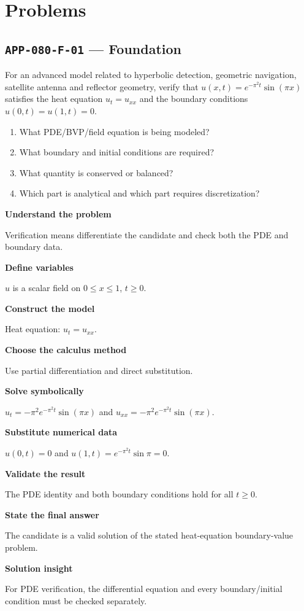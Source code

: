 \documentclass[11pt]{book}
\newcommand{\pid}[1]{\texttt{#1}}
\begin{document}
\section*{Problems}
\subsection*{\pid{APP-080-F-01} — Foundation}
\begin{problembox}
For an advanced model related to hyperbolic detection, geometric navigation, satellite antenna and reflector geometry, verify that $u(x,t)=e^{-\pi^2t}\sin(\pi x)$ satisfies the heat equation $u_t=u_{xx}$ and the boundary conditions $u(0,t)=u(1,t)=0$.
\end{problembox}
\begin{promptbox}\begin{enumerate}
\item What PDE/BVP/field equation is being modeled?
\item What boundary and initial conditions are required?
\item What quantity is conserved or balanced?
\item Which part is analytical and which part requires discretization?
\end{enumerate}\end{promptbox}
\begin{solutionbox}
\textbf{Understand the problem}\par Verification means differentiate the candidate and check both the PDE and boundary data.\par\medskip
\textbf{Define variables}\par $u$ is a scalar field on $0\le x\le1$, $t\ge0$.\par\medskip
\textbf{Construct the model}\par Heat equation: $u_t=u_{xx}$.\par\medskip
\textbf{Choose the calculus method}\par Use partial differentiation and direct substitution.\par\medskip
\textbf{Solve symbolically}\par $u_t=-\pi^2 e^{-\pi^2t}\sin(\pi x)$ and $u_{xx}=-\pi^2 e^{-\pi^2t}\sin(\pi x)$.\par\medskip
\textbf{Substitute numerical data}\par $u(0,t)=0$ and $u(1,t)=e^{-\pi^2t}\sin\pi=0$.\par\medskip
\textbf{Validate the result}\par The PDE identity and both boundary conditions hold for all $t\ge0$.\par\medskip
\textbf{State the final answer}\par The candidate is a valid solution of the stated heat-equation boundary-value problem.\par\medskip
\textbf{Solution insight}\par For PDE verification, the differential equation and every boundary/initial condition must be checked separately.\par\medskip
\end{solutionbox}
\end{document}
